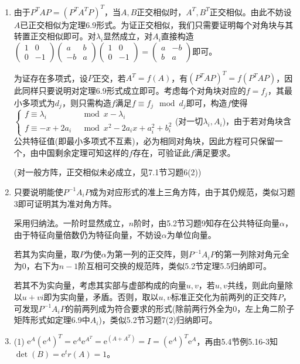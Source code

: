\documentclass[a4paper,UTF8,fontset=windows]{ctexart}
\begin{document}
\begin{enumerate}
\item
由于$P^TAP=(P^TA^TP)^T$，当$A,B$正交相似时，$A^T,B^T$正交相似。由此不妨设$A$已正交相似为定理6.9形式。为证正交相似，我们只需要证明每个对角块与其转置正交相似即可。对$\lambda_i$显然成立，对$A_i$直接构造$\begin{pmatrix}1&0\\0&-1\end{pmatrix}\begin{pmatrix}a&b\\-b&a\end{pmatrix}\begin{pmatrix}1&0\\0&-1\end{pmatrix}=\begin{pmatrix}a&-b\\b&a\end{pmatrix}$即可。

为证存在多项式，设$P$正交，若$A^T=f(A)$，有$(P^TAP)^T=f(P^TAP)$，因此同样只要说明对定理6.9形式成立即可。考虑每个对角块对应的$f=f_j$，其最小多项式为$d_j$，则只需构造$f$满足$f\equiv f_j\mod d_j$即可，构造$f$使得$\begin{cases}f\equiv\lambda_i&\mod x-\lambda_i\\f\equiv-x+2a_i&\mod x^2-2a_ix+a_i^2+b_i^2\end{cases}$(对一切$\lambda_i,A_i$)，由于若对角块含公共特征值(即最小多项式不互素)，必为相同对角块，因此方程可只保留一个，由中国剩余定理可知这样的$f$存在，可验证此$f$满足要求。

(对一般方阵，正交相似未必成立，见7.1节习题6(2))

\item
只要说明能使$P^{-1}A_iP$成为对应形式的准上三角方阵，由于其仍规范，类似习题3即可证明其为准对角方阵。

采用归纳法。一阶时显然成立，$n$阶时，由5.2节习题9知存在公共特征向量$\alpha$，由于特征向量倍数仍为特征向量，不妨设$\alpha$为单位向量。

若其为实向量，取$P$为使$\alpha$为第一列的正交阵，则$P^{-1}A_iP$的第一列除对角元全为0，右下为$n-1$阶互相可交换的规范阵，类似5.2节定理5.5归纳即可。

若其不为实向量，考虑其实部与虚部构成的向量$u,v$，若$u,v$共线，则此向量除以$u+vi$即为实向量，矛盾。否则，取以$u,v$标准正交化为前两列的正交阵$P$，可发现$P^{-1}A_iP$的前两列成为符合要求的形式(除前两行外全为0，左上角二阶子矩阵形式如定理6.9中$A_i$)，类似5.2节习题7(2)归纳即可。

\item
(1) $\mathrm{e}^A(\mathrm{e}^A)^T=\mathrm{e}^A\mathrm{e}^{A^T}=\mathrm{e}^{(A+A^T)}=I=(\mathrm{e}^A)^T\mathrm{e}^A$，再由5.4节例5.16-3知$\det(B)=\mathrm{e}^tr(A)=1$。


\end{enumerate}
\end{document}
